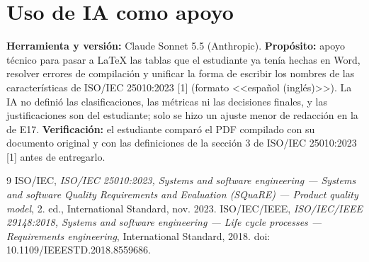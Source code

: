\documentclass[10pt,letterpaper,landscape]{article}
\begin{document}
\section*{Uso de IA como apoyo}
\textbf{Herramienta y versi\'on:} Claude Sonnet 5.5 (Anthropic). \textbf{Prop\'osito:} apoyo t\'ecnico para pasar a \LaTeX{} las tablas que el estudiante ya ten\'ia hechas en Word, resolver errores de compilaci\'on y unificar la forma de escribir los nombres de las caracter\'isticas de ISO/IEC 25010:2023 [1] (formato <<espa\~nol (ingl\'es)>>). La IA no defini\'o las clasificaciones, las m\'etricas ni las decisiones finales, y las justificaciones son del estudiante; solo se hizo un ajuste menor de redacci\'on en la de E17. \textbf{Verificaci\'on:} el estudiante compar\'o el PDF compilado con su documento original y con las definiciones de la secci\'on 3 de ISO/IEC 25010:2023 [1] antes de entregarlo.

\begin{thebibliography}{9}
 ISO/IEC, \emph{ISO/IEC 25010:2023, Systems and software engineering --- Systems and software Quality Requirements and Evaluation (SQuaRE) --- Product quality model}, 2.\textordmasculine{} ed., International Standard, nov. 2023.
 ISO/IEC/IEEE, \emph{ISO/IEC/IEEE 29148:2018, Systems and software engineering --- Life cycle processes --- Requirements engineering}, International Standard, 2018. doi: 10.1109/IEEESTD.2018.8559686.
\end{thebibliography}
\end{document}
